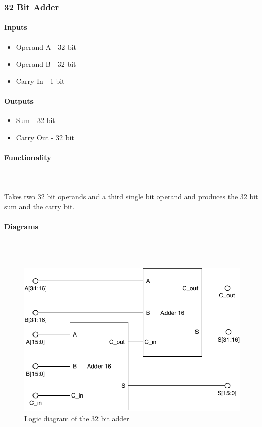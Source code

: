 \documentclass{article}
\begin{document}

    \subsubsection{32 Bit Adder}

    \paragraph{Inputs}
    \begin{itemize}
        \item Operand A - 32 bit
        \item Operand B - 32 bit
        \item Carry In - 1 bit
    \end{itemize}

    \paragraph{Outputs}
    \begin{itemize}
        \item Sum - 32 bit
        \item Carry Out - 32 bit
    \end{itemize}

    \paragraph{Functionality}
    \hfill\\\\
    Takes two 32 bit operands and a third single bit operand and produces the
    32 bit sum and the carry bit.

    \paragraph{Diagrams}
    \hfill\\\\
    \begin{figure}[H]
        \centering
        \includegraphics{../diagrams/alu/adder/adder_32.pdf}
        \caption{Logic diagram of the 32 bit adder}
    \end{figure}
\end{document}
